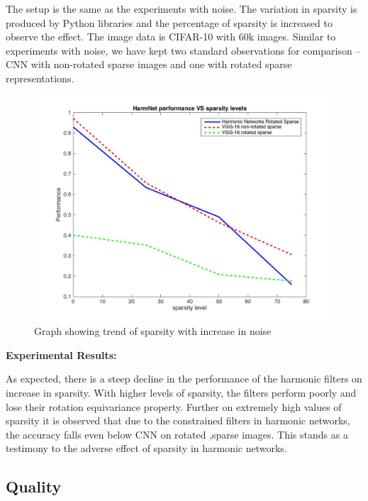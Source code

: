 \documentclass{article}
\begin{document}
The setup is the same as the experiments with noise. The variation in sparsity is produced by Python libraries and the percentage of sparsity is increased to observe the effect. 
The image data is CIFAR-10 with 60k images.
Similar to experiments with noise, we have kept two standard observations for comparison – CNN with non-rotated sparse images and one with rotated sparse representations.

\begin{figure}[t!]
  \includegraphics[width=\linewidth]{vggAndHarmVsSparse.jpg}
  \caption{Graph showing trend of sparsity with increase in noise}
  \label{fig:SparseGraph}
\end{figure}

\textbf{Experimental Results:}

As expected, there is a steep decline in the performance of the harmonic filters on increase in sparsity. With higher levels of sparsity, the filters perform poorly and lose their rotation equivariance property. Further on extremely high values of sparsity it is observed that due to the constrained filters in harmonic networks, the accuracy falls even below CNN on rotated ,sparse images. This stands as a testimony to the adverse effect of sparsity in harmonic networks.

\subsection{Quality}
\end{document}

